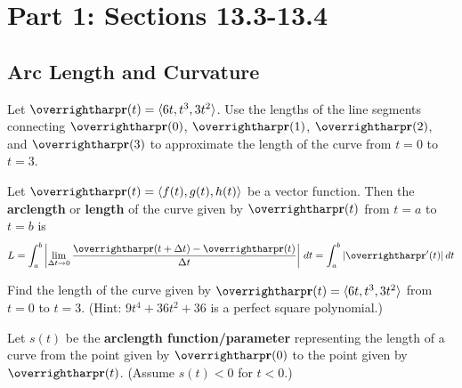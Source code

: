 \documentclass[letterpaper, twoside, 12pt]{book}
\begin{document}
\setcounter{chapter}{1}

\chapter{Part 1: Sections 13.3-13.4}

\setcounter{chapter}{13}
\setcounter{section}{2}

\section{Arc Length and Curvature}

          \begin{problem}
            Let $\vect{r}(t)=\<6t, t^3, 3t^2\>$. Use the lengths of
            the line segments
            connecting $\vect{r}(0)$, $\vect{r}(1)$, $\vect{r}(2)$,
            and $\vect{r}(3)$ to approximate the length of the curve
            from $t=0$ to $t=3$.
          \end{problem}

          \begin{solution}

          \end{solution}

\begin{definition}
Let $\harpvec{r}(t) = \<f(t),g(t),h(t)\>$ be a vector function.
Then the \textbf{arclength} or \textbf{length} of the curve given by
$\harpvec{r}(t)$ from $t=a$ to $t=b$ is
\[
  L
    =
  \int_a^b
  \left|
    \lim_{\Delta{t}\to0}
    \frac{\vect{r}(t+\Delta{t})-\vect{r}(t)}{\Delta{t}}
  \right|
  \dvar{t}
  =
  \int_a^b |\vect{r}'(t)| \dvar{t}
\]
\end{definition}

          \begin{problem}
            Find the length of the curve given by
            $\vect{r}(t)=\<6t, t^3, 3t^2\>$
            from $t=0$ to $t=3$.
            (Hint: $9t^4+36t^2+36$ is a perfect square polynomial.)
          \end{problem}

          \begin{solution}

          \end{solution}

\begin{definition}
Let $s(t)$ be the \textbf{arclength function/parameter} representing the
length of a curve from the point given by
$\harpvec{r}(0)$ to the point given by $\harpvec{r}(t)$.
(Assume $s(t)<0$ for $t<0$.)
\end{definition}
\end{document}
